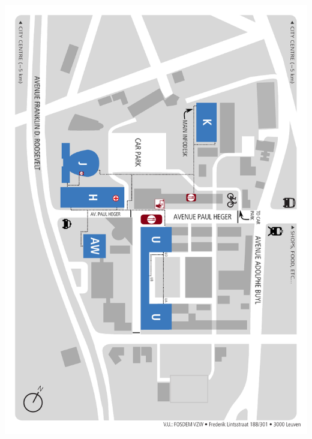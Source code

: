 \documentclass[a4paper,10pt]{article}
\begin{document}
\label{backcover}%
\includegraphics[width=\textwidth]{artwork/campusmap}
\end{document}
